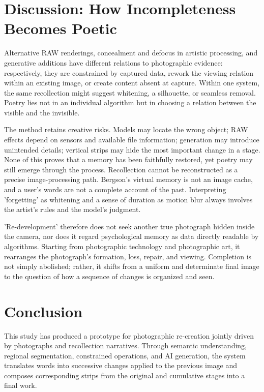 \documentclass[manuscript,review,anonymous,authoryear]{acmart}
\begin{document}
\section{Discussion: How Incompleteness Becomes Poetic}

Alternative RAW renderings, concealment and defocus in artistic processing, and generative additions have different relations to photographic evidence: respectively, they are constrained by captured data, rework the viewing relation within an existing image, or create content absent at capture. Within one system, the same recollection might suggest whitening, a silhouette, or seamless removal. Poetry lies not in an individual algorithm but in choosing a relation between the visible and the invisible.


The method retains creative risks. Models may locate the wrong object; RAW effects depend on sensors and available file information; generation may introduce unintended details; vertical strips may hide the most important change in a stage. None of this proves that a memory has been faithfully restored, yet poetry may still emerge through the process. Recollection cannot be reconstructed as a precise image-processing path. Bergson's virtual memory is not an image cache, and a user's words are not a complete account of the past. Interpreting 'forgetting' as whitening and a sense of duration as motion blur always involves the artist's rules and the model's judgment.


'Re-development' therefore does not seek another true photograph hidden inside the camera, nor does it regard psychological memory as data directly readable by algorithms. Starting from photographic technology and photographic art, it rearranges the photograph's formation, loss, repair, and viewing. Completion is not simply abolished; rather, it shifts from a uniform and determinate final image to the question of how a sequence of changes is organized and seen.


\section{Conclusion}

This study has produced a prototype for photographic re-creation jointly driven by photographs and recollection narratives. Through semantic understanding, regional segmentation, constrained operations, and AI generation, the system translates words into successive changes applied to the previous image and composes corresponding strips from the original and cumulative stages into a final work.
\end{document}
